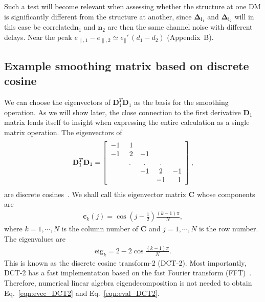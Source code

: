 \documentclass[twocolumn]{aastex631}
\providecommand{\DIFadd}[1]{{\protect\color{BLUE}#1}} %
\providecommand{\DIFdel}[1]{{\protect\color{RED}#1}} %
\providecommand{\DIFaddbegin}{} \providecommand{\DIFaddend}{} %
\providecommand{\DIFdelbegin}{} \providecommand{\DIFdelend}{} %
\newcommand{\DIFscaledelfig}{0.5}
\newlength{\DIFdelgraphicswidth} %
\newlength{\DIFdelgraphicsheight} %
\newcommand{\DIFaddincludegraphics}[2][]{{\color{blue}\fbox{\DIFOincludegraphics[#1]{#2}}}} %
\newcommand{\DIFdelincludegraphics}[2][]{%
\sbox{\DIFdelgraphicsbox}{\DIFOincludegraphics[#1]{#2}}%
\settoboxwidth{\DIFdelgraphicswidth}{\DIFdelgraphicsbox} %
\settoboxtotalheight{\DIFdelgraphicsheight}{\DIFdelgraphicsbox} %
\scalebox{\DIFscaledelfig}{%
\parbox[b]{\DIFdelgraphicswidth}{\usebox{\DIFdelgraphicsbox}\\[-\baselineskip] \rule{\DIFdelgraphicswidth}{0em}}\llap{\resizebox{\DIFdelgraphicswidth}{\DIFdelgraphicsheight}{%
\setlength{\unitlength}{\DIFdelgraphicswidth}%
\begin{picture}(1,1)%
\thicklines\linethickness{2pt} %
{\color[rgb]{1,0,0}\put(0,0){\framebox(1,1){}}}%
{\color[rgb]{1,0,0}\put(0,0){\line( 1,1){1}}}%
{\color[rgb]{1,0,0}\put(0,1){\line(1,-1){1}}}%
\end{picture}%
}\hspace*{3pt}}} %
} %
\DeclareRobustCommand{\DIFaddbegin}{\DIFOaddbegin \let\includegraphics\DIFaddincludegraphics} %
\DeclareRobustCommand{\DIFaddend}{\DIFOaddend \let\includegraphics\DIFOincludegraphics} %
\DeclareRobustCommand{\DIFdelbegin}{\DIFOdelbegin \let\includegraphics\DIFdelincludegraphics} %
\DeclareRobustCommand{\DIFdelend}{\DIFOaddend \let\includegraphics\DIFOincludegraphics} %
\begin{document}
Such a test will become relevant when assessing whether the structure at one DM is significantly different from the structure at another, since \DIFdelbegin \DIFdel{$\mathbf{\Delta}_{\mathbf{i}_1}$ and $\mathbf{\Delta}_{\mathbf{i}_2}$ will in this case be correlated}\DIFdelend \DIFaddbegin \DIFadd{$\mathbf{n}_1$ and $\mathbf{n}_2$ are then the same channel noise with different delays. Near the peak $e_{\parallel,1}-e_{\parallel,2}\simeq e_\parallel'\,(d_1-d_2)$ (Appendix~B)}\DIFaddend .

\subsection{Example smoothing matrix based on discrete cosine}\label{sec:smooth_DCT}
We can choose the eigenvectors of $\mathbf{D}_1^T\mathbf{D}_1$ as the basis for the smoothing operation. As we will show later, the close connection to the first derivative $\mathbf{D}_1$ matrix lends itself to insight when expressing the entire calculation as a single matrix operation. The eigenvectors of
\begin{eqnarray}
\mathbf{D}_1^T\mathbf{D}_1=
\left[ \begin{array}{c c c c c} 
-1 & ~1 &  &  & \\ 
-1 & ~2 & -1 &  &\\
 & . & . & . & \\
 & & -1 & 2 & -1 \\
 &   &   & -1 & ~~1 
\end{array} \right],
\label{eqn:D1TD1}
\end{eqnarray} 
are discrete cosines~\citep{Strang_DCT}. We shall call this eigenvector matrix $\mathbf{C}$ whose components are
\begin{eqnarray}
\mathbf{c}_k(j)=\cos\left(j-\frac{1}{2}\right)\frac{(k-1)\pi}{N},
\label{eqn:evec_DCT2}
\end{eqnarray} 
where $k=1,\cdots,N$ is the column number of $\mathbf{C}$ and $j=1,\cdots,N$ is the row number. The eigenvalues are
\begin{eqnarray}
\text{eig}_k=2-2\cos\frac{(k-1)\pi}{N}.
\label{eqn:eval_DCT2}
\end{eqnarray}
This is known as the discrete cosine transform-2 (DCT-2). Most importantly, DCT-2 has a fast implementation based on the fast Fourier transform (FFT)~\citep{Strang_DCT}. Therefore, numerical linear algebra eigendecomposition is not needed to obtain Eq.~\eqref{eqn:evec_DCT2} and Eq.~\eqref{eqn:eval_DCT2}. 
\end{document}
